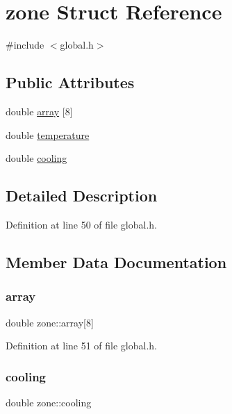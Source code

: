 \hypertarget{structzone}{}\section{zone Struct Reference}
\label{structzone}


{\ttfamily \#include $<$global.\+h$>$}

\subsection*{Public Attributes}
\begin{DoxyCompactItemize}
\item 
double \hyperlink{structzone_a141a5675b0baea51009cfacd0b86c96a}{array} \mbox{[}8\mbox{]}
\item 
double \hyperlink{structzone_a6e401d100a69c69bfeb00ac281980a2a}{temperature}
\item 
double \hyperlink{structzone_ae5d0d06b39c6b8df77e9515543b4f937}{cooling}
\end{DoxyCompactItemize}


\subsection{Detailed Description}


Definition at line 50 of file global.\+h.



\subsection{Member Data Documentation}
\mbox{\label{structzone_a141a5675b0baea51009cfacd0b86c96a}} 
\subsubsection{\texorpdfstring{array}{array}}
{\footnotesize\ttfamily double zone\+::array\mbox{[}8\mbox{]}}



Definition at line 51 of file global.\+h.

\mbox{\label{structzone_ae5d0d06b39c6b8df77e9515543b4f937}} 
\subsubsection{\texorpdfstring{cooling}{cooling}}
{\footnotesize\ttfamily double zone\+::cooling}



